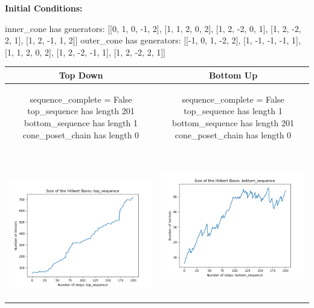 \documentclass[10pt]{article}
\begin{document}
\textbf{Initial Conditions:}
\begin{SAGE}
inner_cone has generators: 
[[0, 1, 0, -1, 2], [1, 1, 2, 0, 2], [1, 2, -2, 0, 1], [1, 2, -2, 2, 1], [1, 2, -1, 1, 2]]
outer_cone has generators: 
[[-1, 0, 1, -2, 2], [1, -1, -1, -1, 1], [1, 1, 2, 0, 2], [1, 2, -2, -1, 1], [1, 2, -2, 2, 1]]

\end{SAGE}
\begin{tabular}{c|c}
\textbf{Top Down} & \textbf{Bottom Up} \\ \hline  
\begin{SAGE}
	sequence_complete = False
	top_sequence has length 201
	bottom_sequence has length 1
	cone_poset_chain has length 0
\end{SAGE} 
&
\begin{SAGE}
	sequence_complete = False
	top_sequence has length 1
	bottom_sequence has length 201
	cone_poset_chain has length 0
\end{SAGE} 
\\ \hline
\
\begin{minipage}{.45\textwidth}
\includegraphics[width=\textwidth]{"DATA/5d/5 generators 2 bound I/top_sequence SIZE"}
\end{minipage} &
\begin{minipage}{.45\textwidth}
\includegraphics[width=\textwidth]{"DATA/5d/5 generators 2 bound I bottomup/bottom_sequence SIZE"}

\end{minipage}
\end{tabular}
\end{document}
